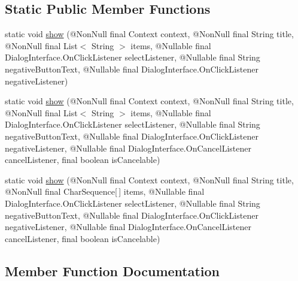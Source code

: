 \subsection*{Static Public Member Functions}
\begin{DoxyCompactItemize}
\item 
static void \hyperlink{classcom_1_1toast_1_1android_1_1gamebase_1_1base_1_1ui_1_1_simple_select_item_dialog_a8b2c1b884c6b4f4aea1a57d305ae57b5}{show} (@Non\+Null final Context context, @Non\+Null final String title, @Non\+Null final List$<$ String $>$ items, @Nullable final Dialog\+Interface.\+On\+Click\+Listener select\+Listener, @Nullable final String negative\+Button\+Text, @Nullable final Dialog\+Interface.\+On\+Click\+Listener negative\+Listener)
\item 
static void \hyperlink{classcom_1_1toast_1_1android_1_1gamebase_1_1base_1_1ui_1_1_simple_select_item_dialog_a453bc4d484f85949532ce8198bd9e9de}{show} (@Non\+Null final Context context, @Non\+Null final String title, @Non\+Null final List$<$ String $>$ items, @Nullable final Dialog\+Interface.\+On\+Click\+Listener select\+Listener, @Nullable final String negative\+Button\+Text, @Nullable final Dialog\+Interface.\+On\+Click\+Listener negative\+Listener, @Nullable final Dialog\+Interface.\+On\+Cancel\+Listener cancel\+Listener, final boolean is\+Cancelable)
\item 
static void \hyperlink{classcom_1_1toast_1_1android_1_1gamebase_1_1base_1_1ui_1_1_simple_select_item_dialog_af317da597de0a837b13a021f5ced8b4f}{show} (@Non\+Null final Context context, @Non\+Null final String title, @Non\+Null final Char\+Sequence\mbox{[}$\,$\mbox{]} items, @Nullable final Dialog\+Interface.\+On\+Click\+Listener select\+Listener, @Nullable final String negative\+Button\+Text, @Nullable final Dialog\+Interface.\+On\+Click\+Listener negative\+Listener, @Nullable final Dialog\+Interface.\+On\+Cancel\+Listener cancel\+Listener, final boolean is\+Cancelable)
\end{DoxyCompactItemize}


\subsection{Member Function Documentation}
\mbox{\label{classcom_1_1toast_1_1android_1_1gamebase_1_1base_1_1ui_1_1_simple_select_item_dialog_a8b2c1b884c6b4f4aea1a57d305ae57b5}} 
